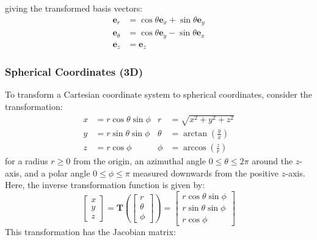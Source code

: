 \documentclass{article}
\begin{document}
giving the transformed basis vectors:
\begin{align*}
    \symbf{e}_r      & = \cos{\theta} \symbf{e}_x + \sin{\theta} \symbf{e}_y \\
    \symbf{e}_\theta & = \cos{\theta} \symbf{e}_y - \sin{\theta} \symbf{e}_x \\
    \symbf{e}_z      & = \symbf{e}_z
\end{align*}
\subsubsection{Spherical Coordinates (3D)}
To transform a Cartesian coordinate system to spherical coordinates,
consider the transformation:
\begin{align*}
    x & = r \cos{\theta} \sin{\phi} & r      & = \sqrt{x^2 + y^2 + z^2}              \\
    y & = r \sin{\theta} \sin{\phi} & \theta & = \arctan{\left( \frac{y}{x} \right)} \\
    z & = r \cos{\phi}              & \phi   & = \arccos{\left( \frac{z}{r} \right)}
\end{align*}
for a radius \(r \geqslant 0\) from the origin, an azimuthal angle
\(0 \leqslant \theta \leqslant 2\pi\) around the \(z\)-axis, and a polar
angle \(0 \leqslant \phi \leqslant \pi\) measured downwards from the
positive \(z\)-axis. Here, the inverse transformation function is given
by:
\begin{equation*}
    \begin{bmatrix}
        x \\
        y \\
        z
    \end{bmatrix}
    = \symbf{T}\left(
    \begin{bmatrix}
        r      \\
        \theta \\
        \phi
    \end{bmatrix}
    \right) =
    \begin{bmatrix}
        r \cos{\theta} \sin{\phi} \\
        r \sin{\theta} \sin{\phi} \\
        r \cos{\phi}
    \end{bmatrix}
\end{equation*}
This transformation has the Jacobian matrix:
\end{document}
